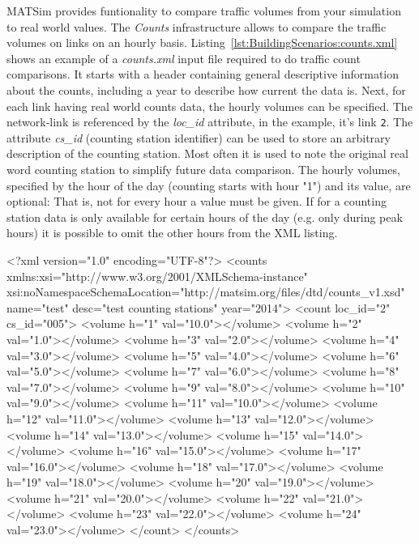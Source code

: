 MATSim provides funtionality to compare traffic volumes from your simulation to
real world values. The \emph{Counts} infrastructure allows to compare the 
traffic volumes on links on an hourly basis. Listing~\ref{lst:BuildingScenarios:counts.xml}
shows an example of a \emph{counts.xml} input file required to do traffic
count comparisons. It starts with a header containing general descriptive 
information about the counts, including a year to describe how current the 
data is. Next, for each link having real world counts data, the hourly volumes
can be specified. The network-link is referenced by the \emph{loc\_id} 
attribute, in the example, it's link {\tt 2}. The attribute \emph{cs\_id}
(counting station identifier) can be used to store an arbitrary description
of the counting station. Most often it is used to note the original real
word counting station to simplify future data comparison. The hourly volumes,
specified by the hour of the day (counting starts with hour "1") and its value,
are optional: That is, not for every hour a value must be given. If for a
counting station data is only available for certain hours of the day (e.g. only
during peak hours) it is possible to omit the other hours from the XML listing.  


\begin{xml-file}[caption=An example of a counts.xml,
label=lst:BuildingScenarios:counts.xml]
<?xml version="1.0" encoding="UTF-8"?>
<counts xmlns:xsi="http://www.w3.org/2001/XMLSchema-instance" 
        xsi:noNamespaceSchemaLocation="http://matsim.org/files/dtd/counts_v1.xsd" 
        name="test" desc="test counting stations" year="2014">
	<count loc_id="2" cs_id="005">
		<volume h="1" val="10.0"></volume>
		<volume h="2" val="1.0"></volume>
		<volume h="3" val="2.0"></volume>
		<volume h="4" val="3.0"></volume>
		<volume h="5" val="4.0"></volume>
		<volume h="6" val="5.0"></volume>
		<volume h="7" val="6.0"></volume>
		<volume h="8" val="7.0"></volume>
		<volume h="9" val="8.0"></volume>
		<volume h="10" val="9.0"></volume>
		<volume h="11" val="10.0"></volume>
		<volume h="12" val="11.0"></volume>
		<volume h="13" val="12.0"></volume>
		<volume h="14" val="13.0"></volume>
		<volume h="15" val="14.0"></volume>
		<volume h="16" val="15.0"></volume>
		<volume h="17" val="16.0"></volume>
		<volume h="18" val="17.0"></volume>
		<volume h="19" val="18.0"></volume>
		<volume h="20" val="19.0"></volume>
		<volume h="21" val="20.0"></volume>
		<volume h="22" val="21.0"></volume>
		<volume h="23" val="22.0"></volume>
		<volume h="24" val="23.0"></volume>
	</count>
</counts>
\end{xml-file}

